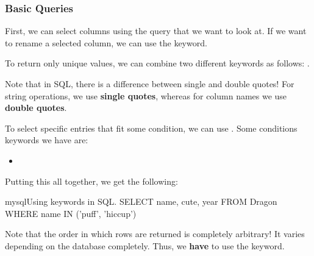 \documentclass[openany]{book}
\begin{document}
\subsubsection{Basic Queries}
First, we can select columns using the  query that we want to look at. If we want to rename a selected column, we can use the  keyword.

To return only unique values, we can combine two different keywords as follows: .

\begin{warn}
	Note that in SQL, there is a difference between single and double quotes! For string operations, we use \textbf{single quotes}, whereas for column names we use \textbf{double quotes}.
\end{warn}

To select specific entries that fit some condition, we can use . Some conditions keywords we have are:
\begin{itemize}
	\item {}
\end{itemize}

Putting this all together, we get the following:
\begin{code}{mysql}{Using keywords in SQL.}
SELECT name, cute, year FROM Dragon WHERE name IN ('puff', 'hiccup')
\end{code}



\begin{warn}
	Note that the order in which rows are returned is completely arbitrary! It varies depending on the database completely. Thus, we \textbf{have} to use the  keyword.
\end{warn}
\end{document}
